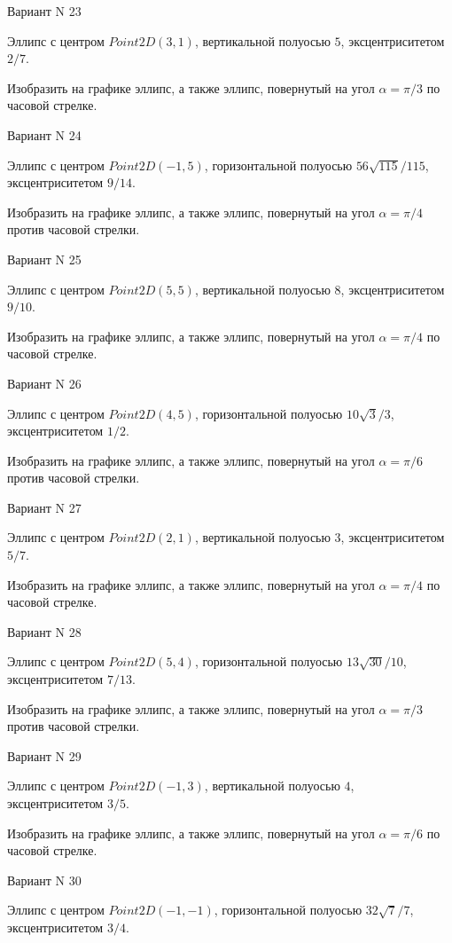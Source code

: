 \documentclass[11pt]{report}
\begin{document}
Вариант N 23

Эллипс с центром $Point2D\left(3, 1\right)$, вертикальной полуосью $5$, эксцентриситетом $2 / 7$.

    Изобразить на графике эллипс, а также эллипс, повернутый на угол $\alpha = $$\pi / 3$ по часовой стрелке.

Вариант N 24

Эллипс с центром $Point2D\left(-1, 5\right)$, горизонтальной полуосью $56 \sqrt{115} / 115$, эксцентриситетом $9 / 14$.

    Изобразить на графике эллипс, а также эллипс, повернутый на угол $\alpha = $$\pi / 4$ против часовой стрелки.

Вариант N 25

Эллипс с центром $Point2D\left(5, 5\right)$, вертикальной полуосью $8$, эксцентриситетом $9 / 10$.

    Изобразить на графике эллипс, а также эллипс, повернутый на угол $\alpha = $$\pi / 4$ по часовой стрелке.

Вариант N 26

Эллипс с центром $Point2D\left(4, 5\right)$, горизонтальной полуосью $10 \sqrt{3} / 3$, эксцентриситетом $1 / 2$.

    Изобразить на графике эллипс, а также эллипс, повернутый на угол $\alpha = $$\pi / 6$ против часовой стрелки.

Вариант N 27

Эллипс с центром $Point2D\left(2, 1\right)$, вертикальной полуосью $3$, эксцентриситетом $5 / 7$.

    Изобразить на графике эллипс, а также эллипс, повернутый на угол $\alpha = $$\pi / 4$ по часовой стрелке.

Вариант N 28

Эллипс с центром $Point2D\left(5, 4\right)$, горизонтальной полуосью $13 \sqrt{30} / 10$, эксцентриситетом $7 / 13$.

    Изобразить на графике эллипс, а также эллипс, повернутый на угол $\alpha = $$\pi / 3$ против часовой стрелки.

Вариант N 29

Эллипс с центром $Point2D\left(-1, 3\right)$, вертикальной полуосью $4$, эксцентриситетом $3 / 5$.

    Изобразить на графике эллипс, а также эллипс, повернутый на угол $\alpha = $$\pi / 6$ по часовой стрелке.

Вариант N 30

Эллипс с центром $Point2D\left(-1, -1\right)$, горизонтальной полуосью $32 \sqrt{7} / 7$, эксцентриситетом $3 / 4$.
\end{document}
